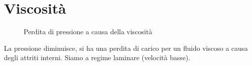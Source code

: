 \section{Viscosità}
\label{viscosita fisica1}
\begin{figure}[htbp]
\centering
{}\quad
{}
\caption{Perdita di pressione a causa della viscosità}
\end{figure}

La pressione diminuisce, si ha una perdita di carico per un fluido viscoso a causa degli attriti interni. Siamo a regime laminare (velocità basse).


